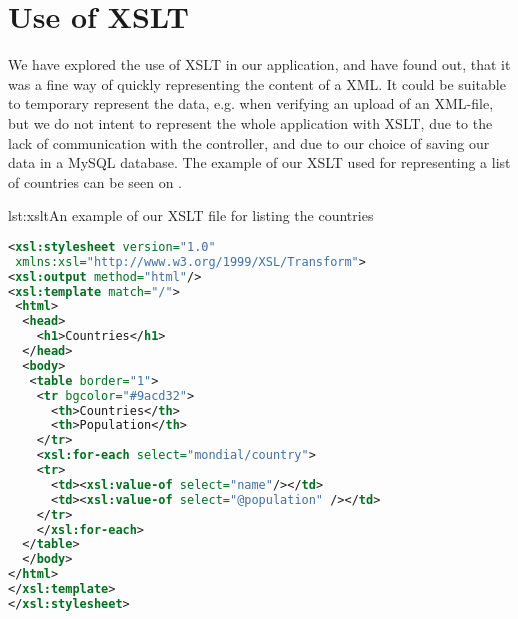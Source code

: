 \section{Use of XSLT}
We have explored the use of XSLT in our application, and have found out, that it was a fine way of quickly representing the content of a XML. It could be suitable to temporary represent the data, e.g. when verifying an upload of an XML-file, but we do not intent to represent the whole application with XSLT, due to the lack of communication with the controller, and due to our choice of saving our data in a MySQL database.
The example of our XSLT used for representing a list of countries can be seen on .
\begin{code}{lst:xslt}{An example of our XSLT file for listing the countries}
\begin{lstlisting}[language=XML]
<xsl:stylesheet version="1.0"
 xmlns:xsl="http://www.w3.org/1999/XSL/Transform">
<xsl:output method="html"/>
<xsl:template match="/">
 <html>
  <head>
    <h1>Countries</h1>
  </head>
  <body>
   <table border="1">
    <tr bgcolor="#9acd32">
      <th>Countries</th>
      <th>Population</th>
    </tr>
    <xsl:for-each select="mondial/country">
    <tr>
      <td><xsl:value-of select="name"/></td>
      <td><xsl:value-of select="@population" /></td>
    </tr>
    </xsl:for-each>
  </table>
  </body>
</html>
</xsl:template>
</xsl:stylesheet>
\end{lstlisting}
\end{code}
